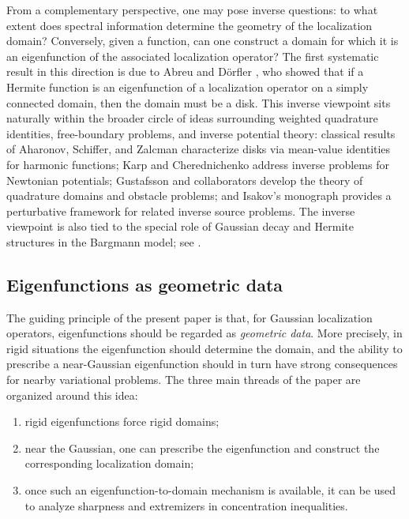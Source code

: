 \documentclass[a4paper,11pt,reqno]{amsart}
\numberwithin{equation}{section}
\theoremstyle{plain} %
\theoremstyle{definition} %
\theoremstyle{remark}
\begin{document}
From a complementary perspective, one may pose inverse questions: to what extent does spectral information determine the geometry of the localization domain? Conversely, given a function, can one construct a domain for which it is an eigenfunction of the associated localization operator? The first systematic result in this direction is due to Abreu and D\"orfler \cite{Abreu-Doerfler}, who showed that if a Hermite function is an eigenfunction of a localization operator on a simply connected domain, then the domain must be a disk. This inverse viewpoint sits naturally within the broader circle of ideas surrounding weighted quadrature identities, free-boundary problems, and inverse potential theory: classical results of Aharonov, Schiffer, and Zalcman \cite{Aharonov-Schiffer-Zalcman} characterize disks via mean-value identities for harmonic functions; Karp \cite{Karp} and Cherednichenko \cite{Cherednichenko} address inverse problems for Newtonian potentials; Gustafsson and collaborators \cite{Gustafsson,Gustafsson-Shahgholian,Shahgholian} develop the theory of quadrature domains and obstacle problems; and Isakov's monograph \cite{Isakov} provides a perturbative framework for related inverse source problems. The inverse viewpoint is also tied to the special role of Gaussian decay and Hermite structures in the Bargmann model; see \cite{Kulikov-Oliveira-Ramos,Goncalves-Oliveira-Steinerberger,Thangavelu}.

\subsection{Eigenfunctions as geometric data}

The guiding principle of the present paper is that, for Gaussian localization operators, eigenfunctions should be regarded as \emph{geometric data}. More precisely, in rigid situations the eigenfunction should determine the domain, and the ability to prescribe a near-Gaussian eigenfunction should in turn have strong consequences for nearby variational problems. The three main threads of the paper are organized around this idea:
\begin{enumerate}
\item rigid eigenfunctions force rigid domains;
\item near the Gaussian, one can prescribe the eigenfunction and construct the corresponding localization domain;
\item once such an eigenfunction-to-domain mechanism is available, it can be used to analyze sharpness and extremizers in concentration inequalities.
\end{enumerate}
\end{document}
